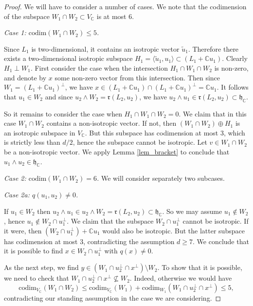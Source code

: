\documentclass[11pt]{article}
\newcommand{\6}{\partial}
\newcommand{\bbC}{\mathbb{C}}
\newcommand{\frh}{\mathfrak{h}}
\newcommand{\frr}{\mathfrak{r}}
\renewcommand{\ge}{\geqslant}
\renewcommand{\le}{\leqslant}
\newcommand{\wdg}{\wedge}
\begin{document}
\begin{proof}
We will have to consider a number of cases. We note that the codimension of
the subspace $W_1\cap W_2\subset V_\bbC$ is at most 6.

\medskip
{\it Case 1: $\mathrm{codim}(W_1\cap W_2) \le 5$.}

Since $L_1$ is two-dimensional, it contains an isotropic vector $\tilde{u}_1$.
Therefore there exists a two-dimensional isotropic subspace $H_1 = \langle\tilde{u}_1,u_1\rangle\subset (L_1+\bbC u_1)$.
Clearly $H_1\perp W_1$.
First consider the case when the intersection $H_1\cap W_1\cap W_2$ is non-zero,
and denote by $x$ some non-zero vector from this intersection.
Then since $W_1 = (L_1+ \bbC u_1)^\perp$, we have $x\in (L_1+ \bbC u_1)\cap (L_1+ \bbC u_1)^\perp = \bbC u_1$.
It follows that $u_1\in W_2$ and since $u_2\wdg W_2 = \frr(L_2,u_2)$,
we have $u_2\wdg u_1 \in \frr(L_2,u_2)\subset \frh_\bbC$.

So it remains to consider the case when $H_1\cap W_1\cap W_2 = 0$.
We claim that in this case $W_1\cap W_2$ contains a non-isotropic vector.
If not, then $(W_1\cap W_2)\oplus H_1$ is an isotropic subspace in $V_\bbC$.
But this subspace has codimension at most 3, which is strictly less than $d/2$,
hence the subspace cannot be isotropic. Let $v\in W_1\cap W_2$ be a non-isotropic vector.
We apply Lemma \ref{lem_bracket} to conclude that $u_1\wdg u_2\in \frh_\bbC$.

\medskip
{\it Case 2: $\mathrm{codim}(W_1\cap W_2) = 6$.}
We will consider separately two subcases.

\medskip
{\it Case 2a: $q(u_1, u_2)\neq 0$.}

If $u_1\in W_2$ then $u_2\wdg u_1\in u_2\wdg W_2 = \frr(L_2,u_2)\subset \frh_\bbC$. So we may assume
$u_1\notin W_2$, hence $u_1\notin W_2\cap u_1^\perp$.
We claim that the subspace $W_2\cap u_1^\perp$ cannot be isotropic.
If it were, then $(W_2\cap u_1^\perp)+\bbC u_1$ would also be isotropic.
But the latter subspace has codimension at most 3, contradicting the assumption $d\ge 7$.
We conclude that it is possible to find $x\in W_2\cap u_1^\perp$ with $q(x)\neq 0$.

As the next step, we find $y\in (W_1\cap u_2^\perp \cap x^\perp) \setminus W_2$.
To show that it is possible, we need to check that $W_1\cap u_2^\perp \cap x^\perp\nsubseteq W_2$.
Indeed, otherwise we would have
\begin{displaymath}
\mathrm{codim}_{V_\bbC}(W_1\cap W_2) \le \mathrm{codim}_{V_\bbC}(W_1) + \mathrm{codim}_{W_1}(W_1\cap u_2^\perp \cap x^\perp)\le 5,
\end{displaymath}
contradicting our standing assumption in the case we are considering.


\end{proof}
\end{document}
